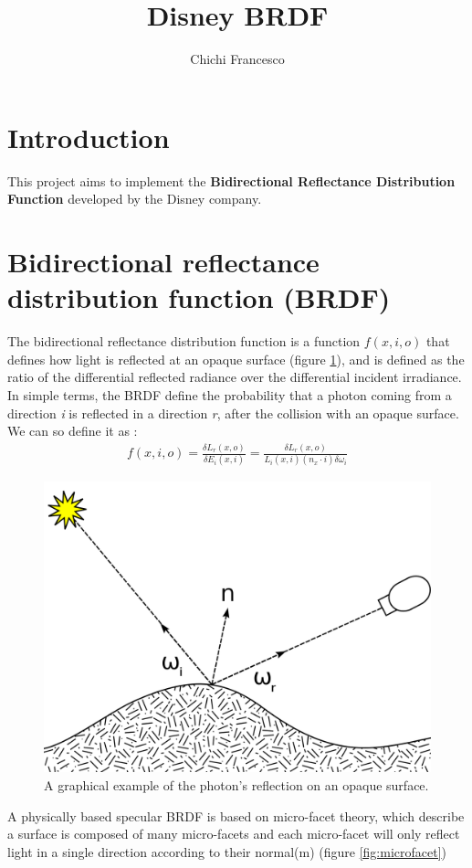 \documentclass[11pt]{article}
\title{Disney BRDF}
\author{Chichi Francesco}
\begin{document}
\maketitle
\graphicspath{{img/}}
\section{Introduction}
	This project aims to implement the \textbf{Bidirectional Reflectance Distribution Function} developed by the Disney company. 

\newpage
\section{Bidirectional reflectance distribution function (BRDF)}
The bidirectional reflectance distribution function is a function $ f(x,i,o) $ that defines how light is reflected at an opaque surface (figure \ref{fig:reflect}), and is defined as the ratio of the differential reflected radiance over the
differential incident irradiance. 
In simple terms, the BRDF define the probability that a photon coming from a direction \textit{i} is reflected in a direction \textit{r}, after the collision with an opaque surface.
We can so define it as \cite{slide}:
\begin{align*}
	f(x,i,o)=\frac{\delta L_r(x,o)}{\delta E_i(x,i)} = \frac{\delta L_r(x,o)}{L_i(x,i)(n_x\cdot i) \delta \omega_i} 
\end{align*}

\begin{figure} [ht]
	\centering
	\includegraphics[width=0.5\linewidth]{img/reflect}
	\caption{A graphical example of the photon's reflection on an opaque surface.}
	\label{fig:reflect}
\end{figure}

A physically based specular BRDF is based on micro-facet theory, which describe a surface is composed of many micro-facets and each micro-facet will only reflect light in a single direction according to their normal(m) (figure \ref{fig:microfacet}) \cite{slide,microfacet} 
\end{document}
